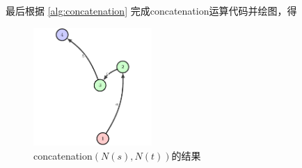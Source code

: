 \documentclass[../report]{subfiles}
\begin{document}
最后根据%
\cref{alg:concatenation}
完成concatenation运算代码并绘图，得
\begin{figure}[H]
  \centering
  \includegraphics[width = 0.4\textwidth]{test_concatenation}
  \caption{concatenation$(N(s),N(t))$的结果}
  \label{fig:test_concatenation}
\end{figure}
\end{document}
